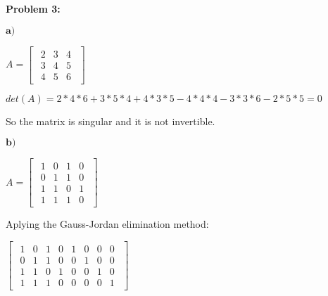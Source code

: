 \textbf{Problem 3:}

\singlespacing

$\textbf{a)}$

\singlespacing

\begin{math}
    A=\begin{bmatrix}
        \begin{array}{ccc}
            2 & 3 & 4 \\
            3 & 4 & 5 \\
            4 & 5 & 6
        \end{array}
    \end{bmatrix}
\end{math}

\singlespacing

\begin{math}
    det(A) = 2*4*6 + 3*5*4 + 4*3*5 - 4*4*4 - 3*3*6 - 2*5*5 = 0
\end{math}

\singlespacing

So the matrix is singular and it is not invertible.

\singlespacing

\singlespacing

$\textbf{b)}$

\singlespacing

\begin{math}
    A = \begin{bmatrix}
        \begin{array}{cccc}
            1 & 0 & 1 & 0 \\
            0 & 1 & 1 & 0 \\
            1 & 1 & 0 & 1 \\
            1 & 1 & 1 & 0
        \end{array}
    \end{bmatrix}
\end{math}

\singlespacing

Aplying the Gauss-Jordan elimination method:

\singlespacing
\singlespacing

\begin{math}
    \begin{bmatrix}
        \begin{array}{cccc|cccc}
            1 & 0 & 1 & 0 & 1 & 0 & 0 & 0 \\
            0 & 1 & 1 & 0 & 0 & 1 & 0 & 0 \\
            1 & 1 & 0 & 1 & 0 & 0 & 1 & 0 \\
            1 & 1 & 1 & 0 & 0 & 0 & 0 & 1
        \end{array}
    \end{bmatrix}
\end{math}

